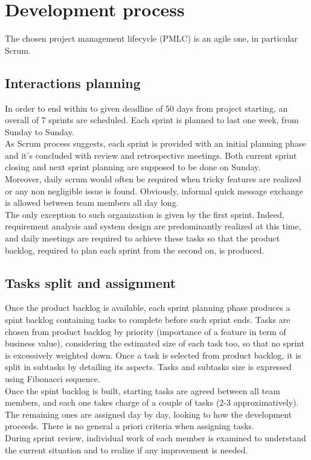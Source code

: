 \chapter{Development process}

The chosen project management lifecycle (PMLC) is an agile one, in particular Scrum.

\section{Interactions planning}

In order to end within to given deadline of 50 days from project starting, an overall of 7 sprints are scheduled. Each sprint is planned to last one week, from Sunday to Sunday.
\\
As Scrum process suggests, each sprint is provided with an initial planning phase and it's concluded with review and retrospective meetings. Both current sprint closing and next sprint planning are supposed to be done on Sunday.
\\
Moreover, daily scrum would often be required when tricky features are realized or any non negligible issue is found. Obviously, informal quick message exchange is allowed between team members all day long.
\\
The only exception to such organization is given by the first sprint. Indeed, requirement analysis and system design are predominantly realized at this time, and daily meetings are required to achieve these tasks so that the product backlog, required to plan each sprint from the second on, is produced.
\\

\section{Tasks split and assignment}

Once the product backlog is available, each sprint planning phase produces a spint backlog containing tasks to complete before such sprint ends. Tasks are chosen from product backlog by priority (importance of a feature in term of business value), considering the estimated size of each task too, so that no sprint is excessively weighted down. Once a task is selected from product backlog, it is split in subtasks by detailing its aspects. Tasks and subtasks size is expressed using Fibonacci sequence. 
\\
Once the spint backlog is built, starting tasks are agreed between all team members, and each one takes charge of a couple of tasks (2-3 approximatively). The remaining ones are assigned day by day, looking to how the development proceeds. There is no general a priori criteria when assigning tasks.
\\
During sprint review, individual work of each member is examined to understand the current situation and to realize if any improvement is needed.

